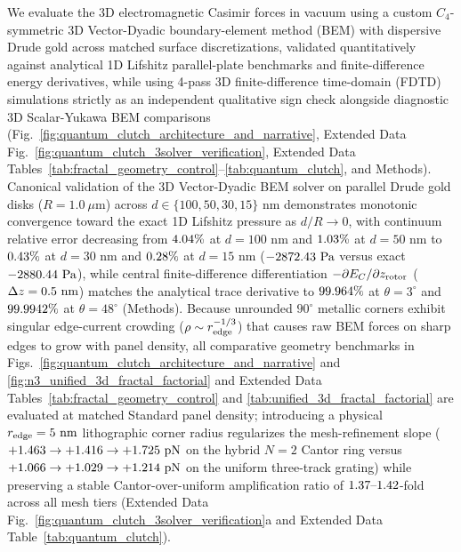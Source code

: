 \documentclass[pdflatex,sn-nature]{sn-jnl}
\DeclareRobustCommand{\roundtwo}[1]{\fpeval{round(#1,2)}}
\DeclareRobustCommand{\roundthree}[1]{\fpeval{round(#1,3)}}
\DeclareRobustCommand{\roundfour}[1]{\fpeval{round(#1,4)}}
\begin{document}
We evaluate the 3D electromagnetic Casimir forces in vacuum using a custom $C_4$-symmetric 3D Vector-Dyadic boundary-element method (BEM) with dispersive Drude gold across matched surface discretizations, validated quantitatively against analytical 1D Lifshitz parallel-plate benchmarks and finite-difference energy derivatives, while using 4-pass 3D finite-difference time-domain (FDTD) simulations strictly as an independent qualitative sign check alongside diagnostic 3D Scalar-Yukawa BEM comparisons\cite{rodriguez2009pra,oskooi2010,rodriguez2011,reid2013pra} (Fig.~\ref{fig:quantum_clutch_architecture_and_narrative}, Extended Data Fig.~\ref{fig:quantum_clutch_3solver_verification}, Extended Data Tables~\ref{tab:fractal_geometry_control}--\ref{tab:quantum_clutch}, and Methods). Canonical validation of the 3D Vector-Dyadic BEM solver on parallel Drude gold disks ($R = 1.0\ \mu\text{m}$) across $d \in \{100, 50, 30, 15\}\text{ nm}$ demonstrates monotonic convergence toward the exact 1D Lifshitz pressure as $d/R \to 0$, with continuum relative error decreasing from $\roundtwo{\BemValPlateRelErrContinuumDonezerozeronmPct}\%$ at $d=100\text{ nm}$ and $\roundtwo{\BemValPlateRelErrContinuumDfivezeronmPct}\%$ at $d=50\text{ nm}$ to $\roundtwo{\BemValPlateRelErrContinuumDthreezeronmPct}\%$ at $d=30\text{ nm}$ and $\roundtwo{\BemValPlateRelErrContinuumDonefivenmPct}\%$ at $d=15\text{ nm}$ ($\roundtwo{\BemValPlateBemContinuumDonefivenmPa}\text{ Pa}$ versus exact $\roundtwo{\BemValLifshitzExactDonefivenmPa}\text{ Pa}$), while central finite-difference differentiation $-\partial E_C/\partial z_{\rm rotor}$ ($\Delta z = 0.5{}\text{ nm}$) matches the analytical trace derivative to $\roundthree{\BemValCantorThetathreeTraceVsFdAgreementPct}\%$ at $\theta=3^\circ$ and $\roundfour{\BemValCantorThetafoureightTraceVsFdAgreementPct}\%$ at $\theta=48^\circ$ (Methods). Because unrounded $90^\circ$ metallic corners exhibit singular edge-current crowding ($\rho \sim r_{\rm edge}^{-1/3}$) that causes raw BEM forces on sharp edges to grow with panel density, all comparative geometry benchmarks in Figs.~\ref{fig:quantum_clutch_architecture_and_narrative} and \ref{fig:n3_unified_3d_fractal_factorial} and Extended Data Tables~\ref{tab:fractal_geometry_control} and \ref{tab:unified_3d_fractal_factorial} are evaluated at matched Standard panel density; introducing a physical $r_{\rm edge} = 5\text{ nm}$ lithographic corner radius regularizes the mesh-refinement slope ($+\roundthree{\CantorNtwoHybridrzBemRfiveNmStdFZPn} \to +\roundthree{\CantorNtwoHybridrzBemRfiveNmHighFZPn} \to +\roundthree{\CantorNtwoHybridrzBemRfiveNmUltraFZPn}\text{ pN}$ on the hybrid $N=2$ Cantor ring versus $+\roundthree{\CtrlUniformperiodicBemRfiveNmStdFZPn} \to +\roundthree{\CtrlUniformperiodicBemRfiveNmHighFZPn} \to +\roundthree{\CtrlUniformperiodicBemRfiveNmUltraFZPn}\text{ pN}$ on the uniform three-track grating) while preserving a stable Cantor-over-uniform amplification ratio of $\roundtwo{\CantorToUniformRatioRfiveNmStd}\text{--}\roundtwo{\CantorToUniformRatioRfiveNmUltra}$-fold across all mesh tiers (Extended Data Fig.~\ref{fig:quantum_clutch_3solver_verification}a and Extended Data Table~\ref{tab:quantum_clutch}).
\end{document}
